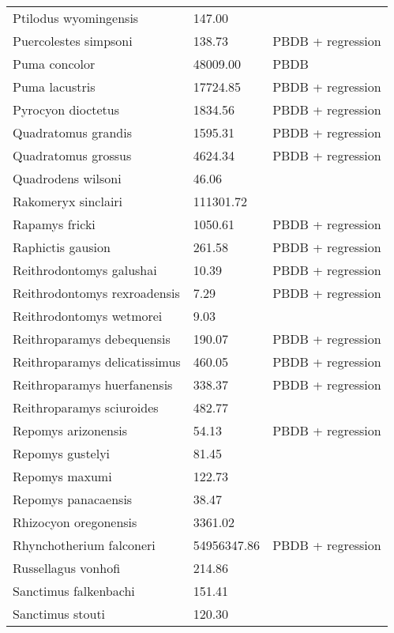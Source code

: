 \documentclass{article}
\begin{document}
\begin{center}
\begin{longtable}{p{} p{} p{}}
    Ptilodus wyomingensis & 147.00 & \cite{Wilson2012} \\ 
    Puercolestes simpsoni & 138.73 & PBDB + regression \\ 
    Puma concolor & 48009.00 & PBDB \\ 
    Puma lacustris & 17724.85 & PBDB + regression \\ 
    Pyrocyon dioctetus & 1834.56 & PBDB + regression \\ 
    Quadratomus grandis & 1595.31 & PBDB + regression \\ 
    Quadratomus grossus & 4624.34 & PBDB + regression \\ 
    Quadrodens wilsoni & 46.06 & \cite{Tomiya2013} \\ 
    Rakomeryx sinclairi & 111301.72 & \cite{Tomiya2013} \\ 
    Rapamys fricki & 1050.61 & PBDB + regression \\ 
    Raphictis gausion & 261.58 & PBDB + regression \\ 
    Reithrodontomys galushai & 10.39 & PBDB + regression \\ 
    Reithrodontomys rexroadensis & 7.29 & PBDB + regression \\ 
    Reithrodontomys wetmorei & 9.03 & \cite{Tomiya2013} \\ 
    Reithroparamys debequensis & 190.07 & PBDB + regression \\ 
    Reithroparamys delicatissimus & 460.05 & PBDB + regression \\ 
    Reithroparamys huerfanensis & 338.37 & PBDB + regression \\ 
    Reithroparamys sciuroides & 482.77 & \cite{Wang1994a} \\ 
    Repomys arizonensis & 54.13 & PBDB + regression \\ 
    Repomys gustelyi & 81.45 & \cite{Tomiya2013} \\ 
    Repomys maxumi & 122.73 & \cite{Tomiya2013} \\ 
    Repomys panacaensis & 38.47 & \cite{Tomiya2013} \\ 
    Rhizocyon oregonensis & 3361.02 & \cite{Tomiya2013} \\ 
    Rhynchotherium falconeri & 54956347.86 & PBDB + regression \\ 
    Russellagus vonhofi & 214.86 & \cite{Tomiya2013} \\ 
    Sanctimus falkenbachi & 151.41 & \cite{Tomiya2013} \\ 
    Sanctimus stouti & 120.30 & \cite{Tomiya2013} \\ 

\end{longtable}
\end{center}
\end{document}
